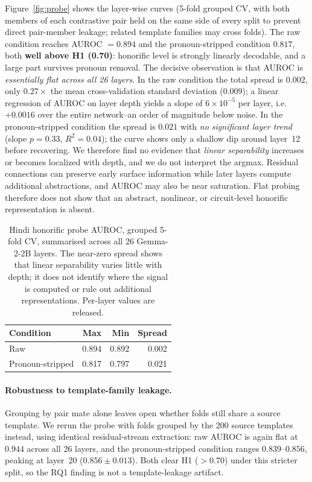 \documentclass[11pt]{article}
\begin{document}
Figure~\ref{fig:probe} shows the layer-wise curves (5-fold grouped CV, with
both members of each contrastive pair held on the same side of every split to
prevent direct pair-member leakage; related template families may cross folds).
The raw condition reaches AUROC $= 0.894$ and the
pronoun-stripped condition $0.817$, both \textbf{well above H1 (0.70)}: honorific
level is strongly linearly decodable, and a large part survives pronoun removal.
The decisive observation is that AUROC is \emph{essentially flat across all 26
layers}. In the raw condition the total spread is $0.002$, only $0.27\times$
the mean cross-validation standard deviation ($0.009$); a linear regression of
AUROC on layer depth yields a slope of $6{\times}10^{-5}$ per layer, i.e.\
$+0.0016$ over the entire network--an order of magnitude below noise. In the
pronoun-stripped condition the spread is $0.021$ with \emph{no significant
layer trend} (slope $p = 0.33$, $R^2 = 0.04$); the curve shows only a shallow
dip around layer~12 before recovering. We therefore find no evidence that
\emph{linear separability} increases or becomes localized with depth, and we do
not interpret the argmax. Residual connections can preserve early surface
information while later layers compute additional abstractions, and AUROC may
also be near saturation. Flat probing therefore does not show that an abstract,
nonlinear, or circuit-level honorific representation is absent.

\begin{table}[t]
\centering
\small
\setlength\tabcolsep{4pt}
\begin{tabular}{lrrr}
\toprule
\textbf{Condition} & \textbf{Max} & \textbf{Min} & \textbf{Spread} \\
\midrule
Raw              & 0.894 & 0.892 & 0.002 \\
Pronoun-stripped & 0.817 & 0.797 & 0.021 \\
\bottomrule
\end{tabular}
\caption{Hindi honorific probe AUROC, grouped 5-fold CV, summarised across all
  26 Gemma-2-2B layers. The near-zero spread shows that linear separability
  varies little with depth; it does not identify where the signal is computed
  or rule out additional representations. Per-layer values are released.}
\label{tab:probe}
\end{table}

\paragraph{Robustness to template-family leakage.} Grouping by pair mate alone
leaves open whether folds still share a source template. We rerun the probe
with folds grouped by the 200 source templates instead, using identical
residual-stream extraction: raw AUROC is again
flat at $0.944$ across all 26 layers, and the pronoun-stripped condition ranges
$0.839$--$0.856$, peaking at layer~20 ($0.856\pm0.013$). Both clear H1 ($>0.70$)
under this stricter split, so the RQ1 finding is not a template-leakage artifact.
\end{document}
